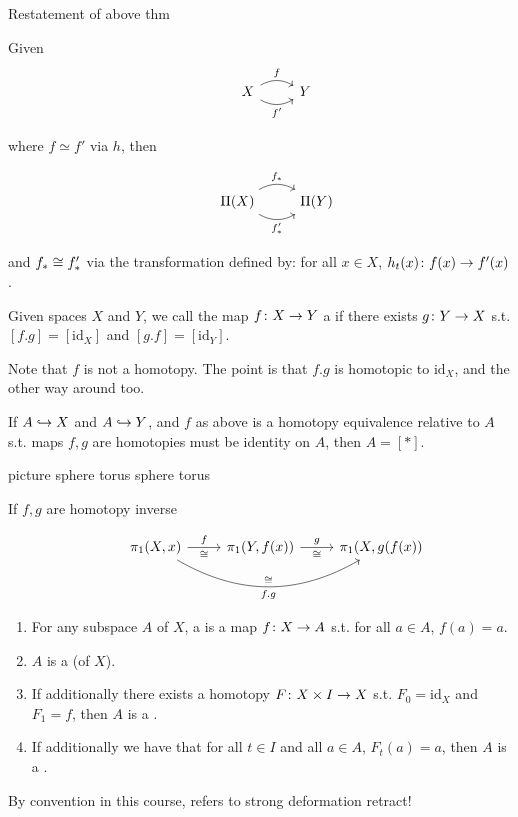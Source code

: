 \documentclass[11pt,leqno,oneside]{amsart}
\numberwithin{thm}{section}
\newcommand{\homotopic}{\simeq}
\newcommand{\fund}[1][1]{\pi_{#1}}
\newcommand{\x}{\times}
\newcommand{\id}{\text{id}}
\begin{document}
\begin{thm}
  Restatement of above thm

  Given
  $$\begin{tikzcd}
    &X \arrow[r, bend left, "f"] \arrow[r, bend right, "f'"'] &Y
  \end{tikzcd}$$

  where $f \homotopic f'$ via $h$, then

  $$\begin{tikzcd}
    &\Pi(X) \arrow[r, bend left, "f_*"] \arrow[r, bend right, "f_*'"'] &\Pi(Y)
  \end{tikzcd}$$

  and $f_* \mathrel{\cong} f_*'$ via the transformation defined by: for all $x \in X$, $h_t(x)\colon f(x) \to f'(x)$.
\end{thm}
\begin{defn}
  Given spaces $X$ and $Y$, we call the map $f\colon X \to Y$ a  if there exists $g\colon Y \to X$ s.t. $[f.g] = [\id_X]$ and $[g.f] = [\id_Y]$.
\end{defn}
\begin{rmk}
  Note that $f$ is not a homotopy.  The point is that $f.g$ is homotopic to $\id_X$, and the other way around too.
\end{rmk}
\begin{rmk}
  If $A \hookrightarrow X$ and $A \hookrightarrow Y$, and $f$ as above is a homotopy equivalence relative to $A$ s.t. maps $f,g$ are homotopies must be identity on $A$, then $A = [*]$.

  picture sphere torus sphere torus

  If $f,g$ are homotopy inverse

  $$\begin{tikzcd}
    &\fund(X,x) \arrow[r, "f", "\isom"'] \arrow[rr, bend right, "\isom", "f.g"'] &\fund(Y, f(x)) \arrow[r, "g", "\isom"'] &\fund(X, g(f(x))
  \end{tikzcd}$$
\end{rmk}
\begin{defn}
  \mbox{}
  \begin{enumerate}
    \item For any subspace $A$ of $X$, a  is a map $f\colon X \to A$ s.t. for all $a \in A$, $f(a) = a$.

    \item $A$ is a  (of $X$).

    \item If additionally there exists a homotopy $F\from X \x I \to X$ s.t. $F_0 = \id_X$ and $F_1 = f$, then $A$ is a .

    \item If additionally we have that for all $t \in I$ and all $a \in A$, $F_t(a) = a$, then $A$ is a .
  \end{enumerate}
  By convention in this course,  refers to strong deformation retract!
\end{defn}
\end{document}
